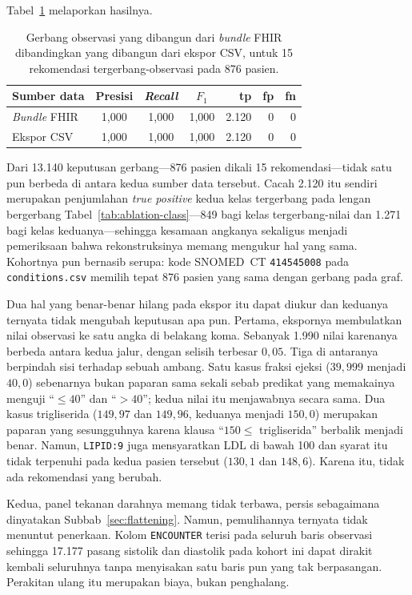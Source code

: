 Tabel~\ref{tab:csv-gating} melaporkan hasilnya.

\begin{table}[h]
\centering
\caption{Gerbang observasi yang dibangun dari \emph{bundle} FHIR dibandingkan yang dibangun dari
ekspor CSV, untuk 15 rekomendasi tergerbang-observasi pada 876 pasien.}
\label{tab:csv-gating}
\begin{tabular}{lcccrrr}
\hline
\textbf{Sumber data} & \textbf{Presisi} & \textbf{\emph{Recall}} & \textbf{$F_1$} &
\textbf{tp} & \textbf{fp} & \textbf{fn} \\
\hline
\emph{Bundle} FHIR & 1,000 & 1,000 & 1,000 & 2.120 & 0 & 0 \\
Ekspor CSV         & 1,000 & 1,000 & 1,000 & 2.120 & 0 & 0 \\
\hline
\end{tabular}
\end{table}

Dari 13.140 keputusan gerbang---876 pasien dikali 15 rekomendasi---tidak satu pun berbeda di
antara kedua sumber data tersebut. Cacah 2.120 itu sendiri merupakan penjumlahan \emph{true
positive} kedua kelas tergerbang pada lengan bergerbang Tabel~\ref{tab:ablation-class}---849
bagi kelas tergerbang-nilai dan 1.271 bagi kelas keduanya---sehingga kesamaan angkanya sekaligus
menjadi pemeriksaan bahwa rekonstruksinya memang mengukur hal yang sama. Kohortnya pun bernasib
serupa: kode SNOMED~CT
\texttt{414545008} pada \texttt{conditions.csv} memilih tepat 876 pasien yang sama dengan
gerbang pada graf.

Dua hal yang benar-benar hilang pada ekspor itu dapat diukur dan keduanya ternyata tidak
mengubah keputusan apa pun. Pertama, ekspornya membulatkan nilai observasi ke satu angka di
belakang koma. Sebanyak 1.990 nilai karenanya berbeda antara kedua jalur, dengan selisih
terbesar $0{,}05$. Tiga di antaranya berpindah sisi terhadap sebuah ambang. Satu kasus fraksi
ejeksi ($39{,}999$ menjadi $40{,}0$) sebenarnya bukan paparan sama sekali sebab predikat yang
memakainya menguji ``$\le 40$'' dan ``$> 40$''; kedua nilai itu menjawabnya secara sama. Dua kasus trigliserida ($149{,}97$ dan $149{,}96$, keduanya menjadi $150{,}0$) merupakan
paparan yang sesungguhnya karena klausa ``$150 \le$ trigliserida'' berbalik menjadi benar.
Namun, \texttt{LIPID:9} juga mensyaratkan LDL di bawah 100 dan syarat itu tidak terpenuhi
pada kedua pasien tersebut ($130{,}1$ dan $148{,}6$). Karena itu, tidak ada rekomendasi yang berubah.

Kedua, panel tekanan darahnya memang tidak terbawa, persis sebagaimana dinyatakan
Subbab~\ref{sec:flattening}. Namun, pemulihannya ternyata tidak menuntut penerkaan. Kolom
\texttt{ENCOUNTER} terisi pada seluruh baris observasi sehingga 17.177 pasang sistolik dan
diastolik pada kohort ini dapat dirakit kembali seluruhnya tanpa menyisakan satu baris pun yang
tak berpasangan. Perakitan ulang itu merupakan biaya, bukan penghalang.

